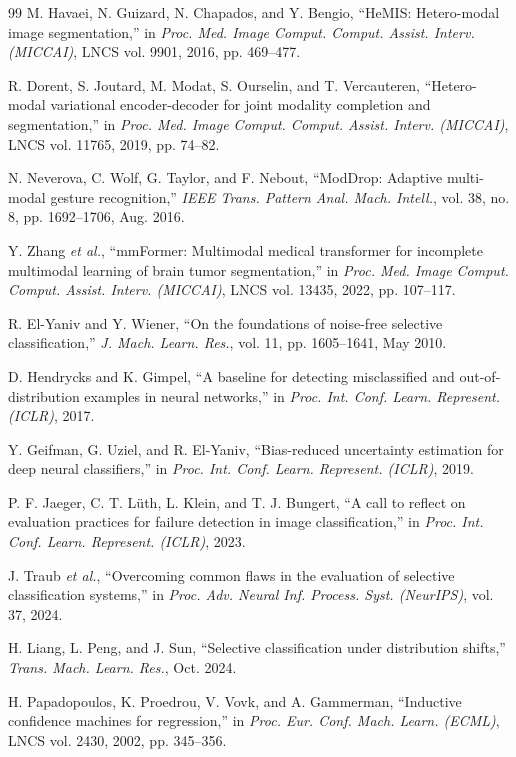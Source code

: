 \documentclass[journal]{IEEEtran}
\begin{document}
\begin{thebibliography}{99}
 M. Havaei, N. Guizard, N. Chapados, and Y. Bengio, ``HeMIS: Hetero-modal image segmentation,'' in \emph{Proc. Med. Image Comput. Comput. Assist. Interv. (MICCAI)}, LNCS vol. 9901, 2016, pp. 469--477.

 R. Dorent, S. Joutard, M. Modat, S. Ourselin, and T. Vercauteren, ``Hetero-modal variational encoder-decoder for joint modality completion and segmentation,'' in \emph{Proc. Med. Image Comput. Comput. Assist. Interv. (MICCAI)}, LNCS vol. 11765, 2019, pp. 74--82.

 N. Neverova, C. Wolf, G. Taylor, and F. Nebout, ``ModDrop: Adaptive multi-modal gesture recognition,'' \emph{IEEE Trans. Pattern Anal. Mach. Intell.}, vol. 38, no. 8, pp. 1692--1706, Aug. 2016.

 Y. Zhang \emph{et al.}, ``mmFormer: Multimodal medical transformer for incomplete multimodal learning of brain tumor segmentation,'' in \emph{Proc. Med. Image Comput. Comput. Assist. Interv. (MICCAI)}, LNCS vol. 13435, 2022, pp. 107--117.

 R. El-Yaniv and Y. Wiener, ``On the foundations of noise-free selective classification,'' \emph{J. Mach. Learn. Res.}, vol. 11, pp. 1605--1641, May 2010.

 D. Hendrycks and K. Gimpel, ``A baseline for detecting misclassified and out-of-distribution examples in neural networks,'' in \emph{Proc. Int. Conf. Learn. Represent. (ICLR)}, 2017.

 Y. Geifman, G. Uziel, and R. El-Yaniv, ``Bias-reduced uncertainty estimation for deep neural classifiers,'' in \emph{Proc. Int. Conf. Learn. Represent. (ICLR)}, 2019.

 P. F. Jaeger, C. T. L\"{u}th, L. Klein, and T. J. Bungert, ``A call to reflect on evaluation practices for failure detection in image classification,'' in \emph{Proc. Int. Conf. Learn. Represent. (ICLR)}, 2023.

 J. Traub \emph{et al.}, ``Overcoming common flaws in the evaluation of selective classification systems,'' in \emph{Proc. Adv. Neural Inf. Process. Syst. (NeurIPS)}, vol. 37, 2024.

 H. Liang, L. Peng, and J. Sun, ``Selective classification under distribution shifts,'' \emph{Trans. Mach. Learn. Res.}, Oct. 2024.

 H. Papadopoulos, K. Proedrou, V. Vovk, and A. Gammerman, ``Inductive confidence machines for regression,'' in \emph{Proc. Eur. Conf. Mach. Learn. (ECML)}, LNCS vol. 2430, 2002, pp. 345--356.


\end{thebibliography}
\end{document}
